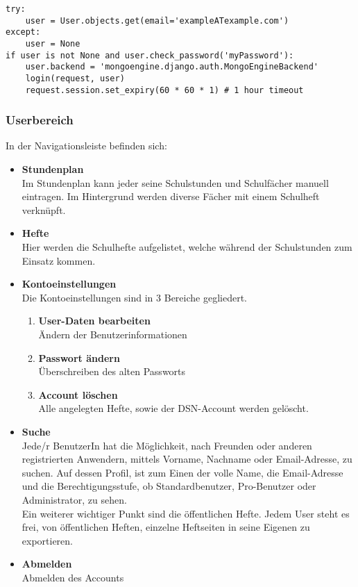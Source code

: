 \begin{lstlisting}[caption={Session Timeout}]
try:
    user = User.objects.get(email='exampleATexample.com')
except:
    user = None
if user is not None and user.check_password('myPassword'):
    user.backend = 'mongoengine.django.auth.MongoEngineBackend'
    login(request, user)
    request.session.set_expiry(60 * 60 * 1) # 1 hour timeout
\end{lstlisting}
\newpage 

\subsubsection{Userbereich}


In der Navigationsleiste befinden sich:
\begin{itemize}
\item \textbf{Stundenplan}\\ Im Stundenplan kann jeder seine Schulstunden und Schulfächer manuell eintragen. Im Hintergrund werden diverse Fächer mit einem Schulheft verknüpft.
\item \textbf{Hefte}\\ Hier werden die Schulhefte aufgelistet, welche während der Schulstunden zum Einsatz kommen.
\item \textbf{Kontoeinstellungen}\\ Die Kontoeinstellungen sind in 3 Bereiche gegliedert.
\begin{enumerate}
\item \textbf{User-Daten bearbeiten}\\ Ändern der Benutzerinformationen
\item \textbf{Passwort ändern}\\ Überschreiben des alten Passworts
\item \textbf{Account löschen}\\ Alle angelegten Hefte, sowie der DSN-Account werden gelöscht.
\end{enumerate}
\item \textbf{Suche}\\ Jede/r BenutzerIn hat die Möglichkeit, nach Freunden oder anderen registrierten Anwendern, mittels Vorname, Nachname oder Email-Adresse, zu suchen. Auf dessen Profil, ist zum Einen der volle Name, die Email-Adresse und die Berechtigungsstufe, ob Standardbenutzer, Pro-Benutzer oder Administrator, zu sehen.\\
Ein weiterer wichtiger Punkt sind die öffentlichen Hefte. Jedem User steht es frei, von öffentlichen Heften, einzelne Heftseiten in seine Eigenen zu exportieren.
\item \textbf{Abmelden}\\ Abmelden des Accounts
\end{itemize}
\newpage 

